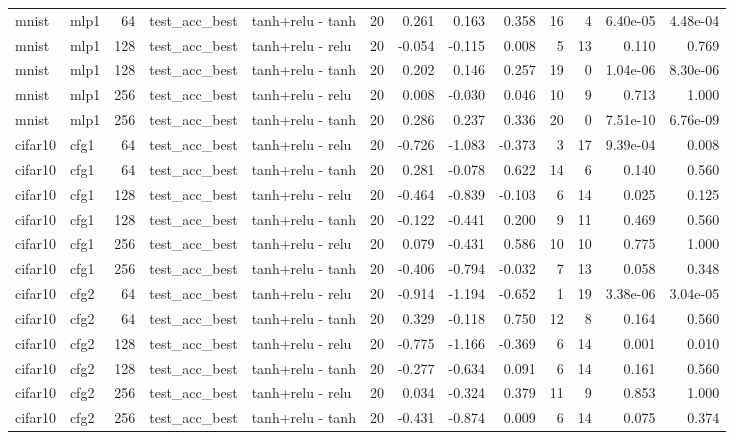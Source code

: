 \begin{table}[htbp]
{\begin{tabular}{@{}llrllrrrrrrrr@{}}
mnist & mlp1 & 64 & test\_acc\_best & tanh+relu - tanh & 20 & 0.261 & 0.163 & 0.358 & 16 & 4 & 6.40e-05 & 4.48e-04 \\
mnist & mlp1 & 128 & test\_acc\_best & tanh+relu - relu & 20 & -0.054 & -0.115 & 0.008 & 5 & 13 & 0.110 & 0.769 \\
mnist & mlp1 & 128 & test\_acc\_best & tanh+relu - tanh & 20 & 0.202 & 0.146 & 0.257 & 19 & 0 & 1.04e-06 & 8.30e-06 \\
mnist & mlp1 & 256 & test\_acc\_best & tanh+relu - relu & 20 & 0.008 & -0.030 & 0.046 & 10 & 9 & 0.713 & 1.000 \\
mnist & mlp1 & 256 & test\_acc\_best & tanh+relu - tanh & 20 & 0.286 & 0.237 & 0.336 & 20 & 0 & 7.51e-10 & 6.76e-09 \\
cifar10 & cfg1 & 64 & test\_acc\_best & tanh+relu - relu & 20 & -0.726 & -1.083 & -0.373 & 3 & 17 & 9.39e-04 & 0.008 \\
cifar10 & cfg1 & 64 & test\_acc\_best & tanh+relu - tanh & 20 & 0.281 & -0.078 & 0.622 & 14 & 6 & 0.140 & 0.560 \\
cifar10 & cfg1 & 128 & test\_acc\_best & tanh+relu - relu & 20 & -0.464 & -0.839 & -0.103 & 6 & 14 & 0.025 & 0.125 \\
cifar10 & cfg1 & 128 & test\_acc\_best & tanh+relu - tanh & 20 & -0.122 & -0.441 & 0.200 & 9 & 11 & 0.469 & 0.560 \\
cifar10 & cfg1 & 256 & test\_acc\_best & tanh+relu - relu & 20 & 0.079 & -0.431 & 0.586 & 10 & 10 & 0.775 & 1.000 \\
cifar10 & cfg1 & 256 & test\_acc\_best & tanh+relu - tanh & 20 & -0.406 & -0.794 & -0.032 & 7 & 13 & 0.058 & 0.348 \\
cifar10 & cfg2 & 64 & test\_acc\_best & tanh+relu - relu & 20 & -0.914 & -1.194 & -0.652 & 1 & 19 & 3.38e-06 & 3.04e-05 \\
cifar10 & cfg2 & 64 & test\_acc\_best & tanh+relu - tanh & 20 & 0.329 & -0.118 & 0.750 & 12 & 8 & 0.164 & 0.560 \\
cifar10 & cfg2 & 128 & test\_acc\_best & tanh+relu - relu & 20 & -0.775 & -1.166 & -0.369 & 6 & 14 & 0.001 & 0.010 \\
cifar10 & cfg2 & 128 & test\_acc\_best & tanh+relu - tanh & 20 & -0.277 & -0.634 & 0.091 & 6 & 14 & 0.161 & 0.560 \\
cifar10 & cfg2 & 256 & test\_acc\_best & tanh+relu - relu & 20 & 0.034 & -0.324 & 0.379 & 11 & 9 & 0.853 & 1.000 \\
cifar10 & cfg2 & 256 & test\_acc\_best & tanh+relu - tanh & 20 & -0.431 & -0.874 & 0.009 & 6 & 14 & 0.075 & 0.374 \\

\end{tabular}}
\end{table}
